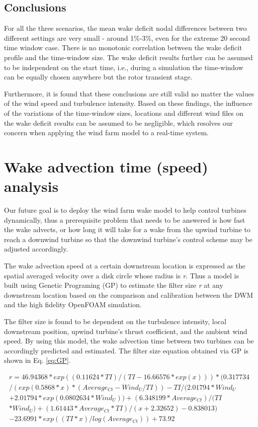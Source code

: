 \documentclass{umthesis}
\begin{document}
\subsection{Conclusions}
For all the three scenarios, the mean wake deficit nodal differences between two different settings are very small - around 1\%-3\%, even for the extreme 20 second time window case. There is no monotonic correlation between the wake deficit profile and the time-window size. The wake deficit results further can be assumed to be independent on the start time, i.e., during a simulation the time-window can be equally chosen anywhere but the rotor transient stage.

Furthermore, it is found that these conclusions are still valid no matter the values of the wind speed and turbulence intensity. Based on these findings, the influence of the variations of the time-window sizes, locations and different wind files on the wake deficit results can be assumed to be negligible, which resolves our concern when applying the wind farm model to a real-time system.

\section{Wake advection time (speed) analysis}\label{sec:DWM_advection_time}
Our future goal is to deploy the wind farm wake model to help control turbines dynamically, thus a prerequisite problem that needs to be answered is how fast the wake advects, or how long it will take for a wake from the upwind turbine to reach a downwind turbine so that the downwind turbine’s control scheme may be adjusted accordingly.

The wake advection speed at a certain downstream location is expressed as the spatial averaged velocity over a disk circle whose radius is \emph{r}. Thus a model is built using Genetic Programing (GP) to estimate the filter size \emph{r} at any downstream location based on the comparison and calibration between the DWM and the high fidelity OpenFOAM simulation.

The filter size is found to be dependent on the turbulence intensity, local downstream position, upwind turbine’s thrust coefficient, and the ambient wind speed. By using this model, the wake advection time between two turbines can be accordingly predicted and estimated. The filter size equation obtained via GP is shown in Eq. \ref{eq:GP}.

\begin{equation}\label{eq:GP}
\begin{split}
r=46.94368*exp((0.11624*TI)/(TI-16.66576*exp(x)))*(0.317734 \\
/(exp(0.5868*x)*(Average_{Ct} - Wind_U/TI))- TI/(2.01794*Wind_U \\
+ 2.01794*exp(0.0802634*Wind_U)) + (6.348199*Average_{Ct})/(TI \\
*Wind_U) +(1.61443*Average_{Ct}*TI)/(x + 2.32652) - 0.838013) \\
 - 23.6991*exp((TI*x)/log(Average_{Ct})) + 73.92
\end{split}
\end{equation}
\end{document}
